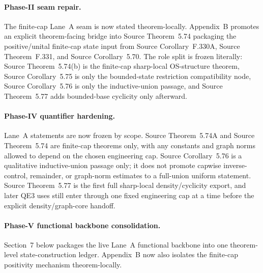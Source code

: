 \documentclass[preprint,aip,jmp,amsmath,amssymb,nofootinbib]{revtex4-2}
\begin{document}
\paragraph{Phase-II seam repair.}
The finite-cap Lane~A seam is now stated theorem-locally. Appendix~B promotes an explicit theorem-facing bridge into Source Theorem~5.74 packaging the positive/unital finite-cap state input from Source Corollary~F.330A, Source Theorem~F.331, and Source Corollary~5.70. The role split is frozen literally: Source Theorem~5.74(b) is the finite-cap sharp-local OS-structure theorem, Source Corollary~5.75 is only the bounded-state restriction compatibility node, Source Corollary~5.76 is only the inductive-union passage, and Source Theorem~5.77 adds bounded-base cyclicity only afterward.

\paragraph{Phase-IV quantifier hardening.}
Lane~A statements are now frozen by scope. Source Theorem~5.74A and Source Theorem~5.74 are finite-cap theorems only, with any constants and graph norms allowed to depend on the chosen engineering cap. Source Corollary~5.76 is a qualitative inductive-union passage only; it does not promote capwise inverse-control, remainder, or graph-norm estimates to a full-union uniform statement. Source Theorem~5.77 is the first full sharp-local density/cyclicity export, and later QE3 uses still enter through one fixed engineering cap at a time before the explicit density/graph-core handoff.


\paragraph{Phase-V functional backbone consolidation.}
Section~7 below packages the live Lane~A functional backbone into one theorem-level state-construction ledger. Appendix~B now also isolates the finite-cap positivity mechanism theorem-locally.
\end{document}
